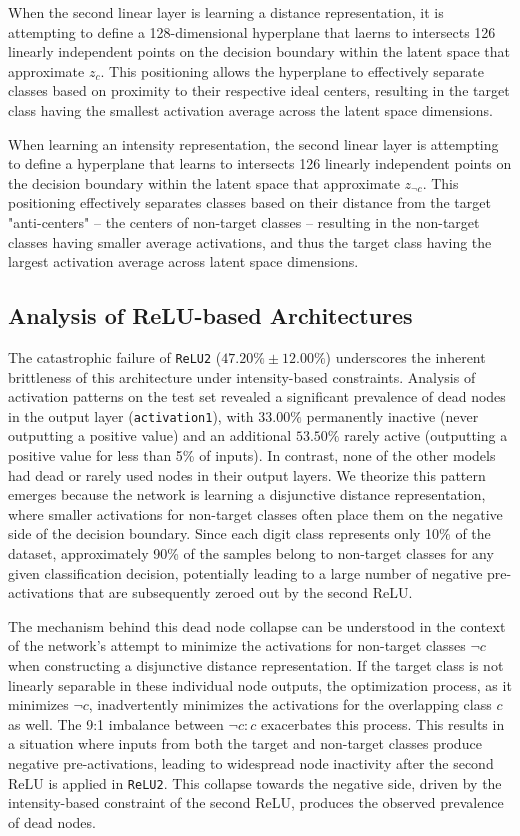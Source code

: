 When the second linear layer is learning a distance representation, it is attempting to define a 128-dimensional hyperplane that laerns to intersects 126 linearly independent points on the decision boundary within the latent space that approximate $z_c$. This positioning allows the hyperplane to effectively separate classes based on proximity to their respective ideal centers, resulting in the target class having the smallest activation average across the latent space dimensions.

When learning an intensity representation, the second linear layer is attempting to define a hyperplane that learns to intersects 126 linearly independent points on the decision boundary within the latent space that approximate $z_{\neg c}$. This positioning effectively separates classes based on their distance from the target "anti-centers" -- the centers of non-target classes -- resulting in the non-target classes having smaller average activations, and thus the target class having the largest activation average across latent space dimensions.

\subsection{Analysis of ReLU-based Architectures}

The catastrophic failure of \texttt{ReLU2} ($47.20\% \pm 12.00\%$) underscores the inherent brittleness of this architecture under intensity-based constraints. Analysis of activation patterns on the test set revealed a significant prevalence of dead nodes in the output layer (\texttt{activation1}), with $33.00\%$ permanently inactive (never outputting a positive value) and an additional $53.50\%$ rarely active (outputting a positive value for less than 5\% of inputs). In contrast, none of the other models had dead or rarely used nodes in their output layers. We theorize this pattern emerges because the network is learning a disjunctive distance representation, where smaller activations for non-target classes often place them on the negative side of the decision boundary. Since each digit class represents only 10\% of the dataset, approximately 90\% of the samples belong to non-target classes for any given classification decision, potentially leading to a large number of negative pre-activations that are subsequently zeroed out by the second ReLU.

The mechanism behind this dead node collapse can be understood in the context of the network's attempt to minimize the activations for non-target classes $\neg c$ when constructing a disjunctive distance representation. If the target class is not linearly separable in these individual node outputs, the optimization process, as it minimizes $\neg c$, inadvertently minimizes the activations for the overlapping class $c$ as well. The 9:1 imbalance between $\neg c:c$ exacerbates this process. This results in a situation where inputs from both the target and non-target classes produce negative pre-activations, leading to widespread node inactivity after the second ReLU is applied in \texttt{ReLU2}. This collapse towards the negative side, driven by the intensity-based constraint of the second ReLU, produces the observed prevalence of dead nodes.

